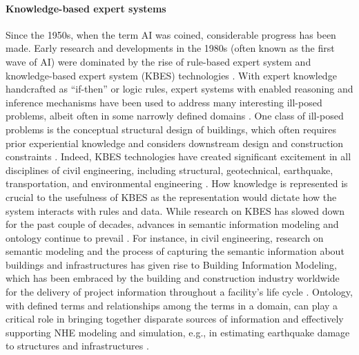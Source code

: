 \paragraph{Knowledge-based expert systems} Since the 1950s, when the term AI was coined, considerable progress has been made. Early research and developments in the 1980s (often known as the first wave of AI) were dominated by the rise of rule-based expert system and knowledge-based expert system (KBES) technologies \citep{hayes-roth1983building}. With expert knowledge handcrafted as ``if-then'' or logic rules, expert systems with enabled reasoning and inference mechanisms have been used to address many interesting ill-posed problems, albeit often in some narrowly defined domains \citep{simon1973structure}. One class of ill-posed problems is the conceptual structural design of buildings, which often requires prior experiential knowledge and considers downstream design and construction constraints \citep{sriram1985knowledgebased, kumar1997cadrem, jain1991formal-i, jain1991formal-ii}. Indeed, KBES technologies have created significant excitement in all disciplines of civil engineering, including structural, geotechnical, earthquake, transportation, and environmental engineering \citep{kostem1986expert, palmer1987special, dym1991knowledgebased, cohn1992knowledgebased, sriram1997intelligent}. How knowledge is represented is crucial to the usefulness of KBES as the representation would dictate how the system interacts with rules and data. While research on KBES has slowed down for the past couple of decades, advances in semantic information modeling and ontology continue to prevail \citep{stevens2000ontologybased, noy2009bioportal}. For instance, in civil engineering, research on semantic modeling and the process of capturing the semantic information about buildings and infrastructures has given rise to Building Information Modeling, which has been embraced by the building and construction industry worldwide for the delivery of project information throughout a facility's life cycle \citep{sacks2018bim}. Ontology, with defined terms and relationships among the terms in a domain, can play a critical role in bringing together disparate sources of information and effectively supporting NHE modeling and simulation, e.g., in estimating earthquake damage to structures and infrastructures \citep{yu2016image}.

